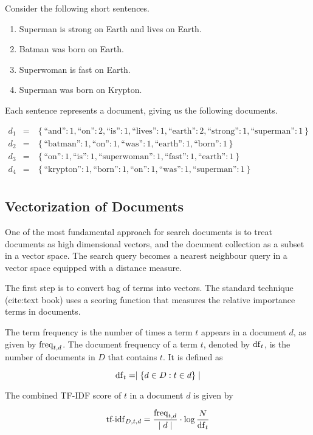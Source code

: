 	\begin{ex}
	\label{ex:superhero-documents}
		Consider the following short sentences.
		
		\begin{enumerate}
			\item Superman is strong on Earth and lives on Earth.
			\item Batman was born on Earth.
			\item Superwoman is fast on Earth.
			\item Superman was born on Krypton.
		\end{enumerate}
		
		Each sentence represents a document, giving us the following documents.
		
		\begin{eqnarray*}
			d_1 &=& \left\{\textrm{``and''}: 1, \textrm{``on''}: 2, \textrm{``is''}: 1, \textrm{``lives''}: 1, \textrm{``earth''}: 2, \textrm{``strong''}: 1, \textrm{``superman''}: 1\right\} \\
			d_2 &=& \left\{\textrm{``batman''}: 1, \textrm{``on''}: 1, \textrm{``was''}: 1, \textrm{``earth''}: 1, \textrm{``born''}: 1\right\} \\
			d_3 &=& \left\{\textrm{``on''}: 1, \textrm{``is''}: 1, \textrm{``superwoman''}: 1, \textrm{``fast''}: 1, \textrm{``earth''}: 1\right\} \\
			d_4 &=& \left\{\textrm{``krypton''}: 1, \textrm{``born''}: 1, \textrm{``on''}: 1, \textrm{``was''}: 1, \textrm{``superman''}: 1\right\} \\
		\end{eqnarray*}
	\end{ex}
	
	\subsection{Vectorization of Documents}
		One of the most fundamental approach for search documents is to treat documents as high dimensional vectors, and the document collection as a subset in a vector space.  The search query becomes a nearest neighbour query in a vector space equipped with a distance measure.
		
		The first step is to convert bag of terms into vectors.  The standard technique (cite:text book) uses a scoring function that measures the relative importance terms in documents.
		
		\begin{defn}
			The term frequency is the number of times a term $t$ appears in a document $d$, as given by $\operatorname{freq}_{t, d}$.  The document frequency of a term $t$, denoted by $\operatorname{df}_t$, is the number of documents in $D$ that contains $t$.  It is defined as
			
			$$\operatorname{df}_t = \mid \left\{d \in D: t \in d\right\} \mid$$
			
			The combined TF-IDF score of $t$ in a document $d$ is given by
			
			$$\operatorname{tf-idf}_{D, t, d} = \frac{\operatorname{freq}_{t, d}}{\mid d \mid} \cdot \log{\frac{N}{\operatorname{df}_t}}$$
		\end{defn}
		
